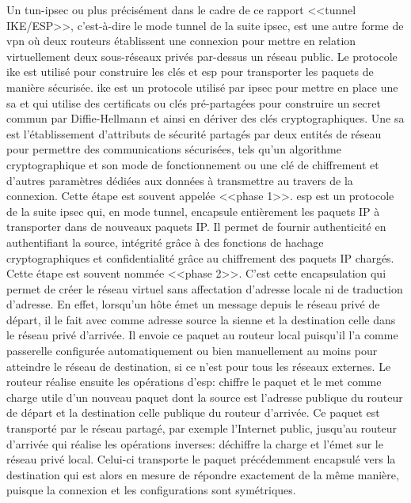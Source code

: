 \documentclass[12pt, oneside, a4paper, titlepage]{report}
\begin{document}
Un \gls{tun-ipsec} ou plus précisément dans le cadre de ce rapport <<tunnel
IKE/ESP>>, c'est-à-dire le mode tunnel de la suite \gls{ipsec}, est une autre
forme de \gls{vpn} où deux routeurs établissent une connexion pour mettre en
relation virtuellement deux sous-réseaux privés par-dessus un réseau public. Le
protocole \gls{ike} est utilisé pour construire les clés et \gls{esp} pour
transporter les paquets de manière sécurisée. \gls{ike} est un protocole utilisé
par \gls{ipsec} pour mettre en place une \gls{sa} et qui utilise des certificats
ou clés pré-partagées pour construire un secret commun par Diffie-Hellmann et
ainsi en dériver des clés cryptographiques. Une \gls{sa} est l'établissement
d'attributs de sécurité partagés par deux entités de réseau pour permettre des
communications sécurisées, tels qu'un algorithme cryptographique et son mode de
fonctionnement ou une clé de chiffrement et d'autres paramètres dédiées aux
données à transmettre au travers de la connexion. Cette étape est souvent
appelée <<phase 1>>. \gls{esp} est un protocole de la suite \gls{ipsec} qui, en
mode tunnel, encapsule entièrement les paquets IP à transporter dans de nouveaux
paquets IP\@. Il permet de fournir authenticité en authentifiant la source,
intégrité grâce à des fonctions de hachage cryptographiques et confidentialité
grâce au chiffrement des paquets IP chargés.  Cette étape est souvent nommée
<<phase 2>>. C'est cette encapsulation qui permet de créer le réseau virtuel
sans affectation d'adresse locale ni de traduction d'adresse. En effet,
lorsqu'un hôte émet un message depuis le réseau privé de départ, il le fait avec
comme adresse source la sienne et la destination celle dans le réseau privé
d'arrivée. Il envoie ce paquet au routeur local puisqu'il l'a comme passerelle
configurée automatiquement ou bien manuellement au moins pour atteindre le
réseau de destination, si ce n'est pour tous les réseaux externes. Le routeur
réalise ensuite les opérations d'\gls{esp}: chiffre le paquet et le met comme
charge utile d'un nouveau paquet dont la source est l'adresse publique du
routeur de départ et la destination celle publique du routeur d'arrivée. Ce
paquet est transporté par le réseau partagé, par exemple l'Internet public,
jusqu'au routeur d'arrivée qui réalise les opérations inverses: déchiffre la
charge et l'émet sur le réseau privé local. Celui-ci transporte le paquet
précédemment encapsulé vers la destination qui est alors en mesure de répondre
exactement de la même manière, puisque la connexion et les configurations sont
symétriques.
\end{document}
